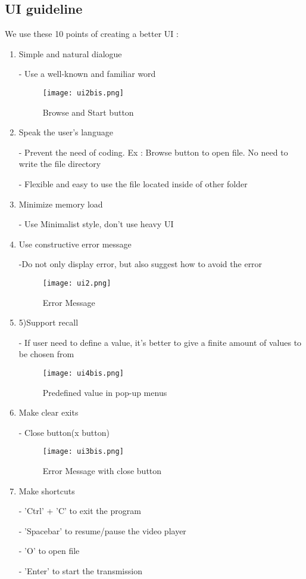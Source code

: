 \subsection{UI guideline}
We use these 10 points of creating a better UI\cite{website:ux} :
\begin{enumerate}
\item Simple and natural dialogue
	\par - Use a well-known and familiar word
\begin{figure}[ht]
	\centering
			\texttt{[image: ui2bis.png]}
	\caption{Browse and Start button}
	\label{fig:browse-start }
\end{figure}
\item Speak the user’s language
	\par - Prevent the need of coding. Ex : Browse button to open file. No need to write the file directory 
	\par - Flexible and easy to use the file located inside of other folder
\item Minimize memory load
	\par - Use Minimalist style, don’t use heavy UI
\clearpage 
\item Use constructive error message
	\par -Do not only display error, but also suggest how to avoid the error
\begin{figure}[ht]
	\centering
			\texttt{[image: ui2.png]}
	\caption{Error Message}
	\label{fig: error }
\end{figure}
\item 5)Support recall
	\par - If user need to define a value, it’s better to give a finite amount of values to be chosen from
\begin{figure}[ht]
	\centering
			\texttt{[image: ui4bis.png]}
	\caption{Predefined value in pop-up menus}
	\label{fig: define-value }
\end{figure}

\item Make clear exits
	\par- Close button(x button)
\begin{figure}[ht]
	\centering
			\texttt{[image: ui3bis.png]}
	\caption{Error Message with close button}
	\label{fig: error-close }
\end{figure}

\item Make shortcuts
	\par - 'Ctrl' + 'C' to exit the program
	\par - 'Spacebar' to resume/pause the video player
	\par - 'O' to open file 
	\par - 'Enter' to start the transmission
	

\end{enumerate}
